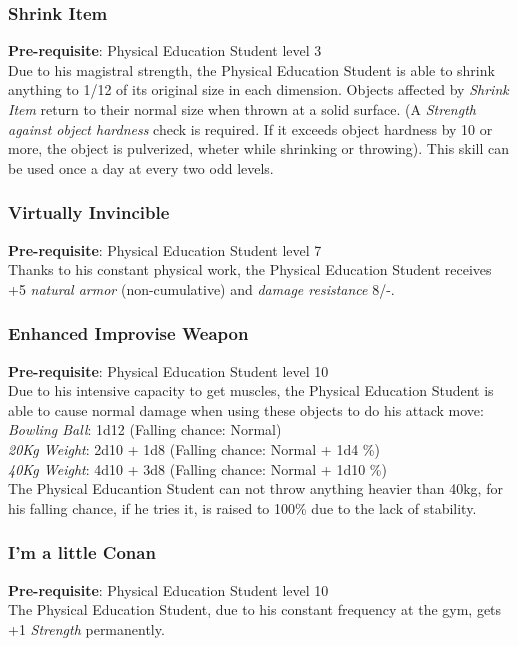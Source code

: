 \documentclass[ letterpaper,12pt]{article}
\begin{document}
\subsubsection{Shrink Item}
 {\bf Pre-requisite}: Physical Education Student level 3\\
 Due to his magistral strength, the Physical Education Student is able to shrink anything to 1/12 of its original size in each dimension. Objects affected by {\it Shrink Item} return to their normal size when thrown at a solid surface. (A {\it Strength against object hardness} check is required. If it exceeds object hardness by 10 or more, the object is pulverized, wheter while shrinking or throwing). This skill can be used once a day at every two odd levels.

\subsubsection{Virtually Invincible}
 {\bf Pre-requisite}: Physical Education Student level 7\\
 Thanks to his constant physical work, the Physical Education Student receives +5 {\it natural armor} (non-cumulative) and {\it damage resistance} 8/-.

\subsubsection{Enhanced Improvise Weapon}
{\bf Pre-requisite}: Physical Education Student level 10\\
 Due to his intensive capacity to get muscles, the Physical Education Student is able to cause normal damage when using these objects to do his attack move:
{\it Bowling Ball}: 1d12 (Falling chance: Normal)\\
{\it 20Kg Weight}: 2d10 + 1d8 (Falling chance: Normal + 1d4 \%)\\
{\it 40Kg Weight}: 4d10 + 3d8 (Falling chance: Normal + 1d10 \%)\\
 The Physical Educantion Student can not throw anything heavier than 40kg, for his falling chance, if he tries it, is raised to 100\% due to the lack of stability.

\subsubsection{I'm a little Conan}
 {\bf Pre-requisite}: Physical Education Student level 10\\
 The Physical Education Student, due to his constant frequency at the gym, gets +1 {\it Strength} permanently.
\end{document}
